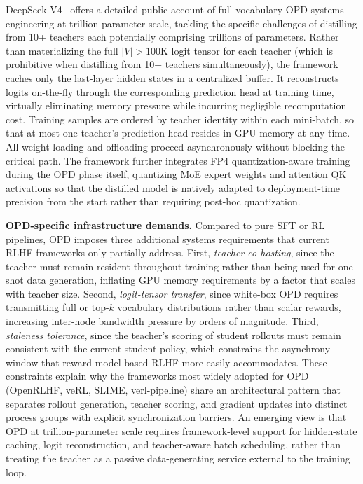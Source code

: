 \documentclass{article} %
\begin{document}
DeepSeek-V4~\citep{deepseekv4} offers a detailed public account of full-vocabulary OPD systems engineering at trillion-parameter scale, tackling the specific challenges of distilling from 10+ teachers each potentially comprising trillions of parameters. Rather than materializing the full $|V| > 100$K logit tensor for each teacher (which is prohibitive when distilling from 10+ teachers simultaneously), the framework caches only the last-layer hidden states in a centralized buffer. It reconstructs logits on-the-fly through the corresponding prediction head at training time, virtually eliminating memory pressure while incurring negligible recomputation cost. Training samples are ordered by teacher identity within each mini-batch, so that at most one teacher's prediction head resides in GPU memory at any time. All weight loading and offloading proceed asynchronously without blocking the critical path. The framework further integrates FP4 quantization-aware training during the OPD phase itself, quantizing MoE expert weights and attention QK activations so that the distilled model is natively adapted to deployment-time precision from the start rather than requiring post-hoc quantization.

\textbf{OPD-specific infrastructure demands.} Compared to pure SFT or RL pipelines, OPD imposes three additional systems requirements that current RLHF frameworks only partially address. First, \emph{teacher co-hosting}, since the teacher must remain resident throughout training rather than being used for one-shot data generation, inflating GPU memory requirements by a factor that scales with teacher size. Second, \emph{logit-tensor transfer}, since white-box OPD requires transmitting full or top-$k$ vocabulary distributions rather than scalar rewards, increasing inter-node bandwidth pressure by orders of magnitude. Third, \emph{staleness tolerance}, since the teacher's scoring of student rollouts must remain consistent with the current student policy, which constrains the asynchrony window that reward-model-based RLHF more easily accommodates. These constraints explain why the frameworks most widely adopted for OPD (OpenRLHF, veRL, SLIME, verl-pipeline) share an architectural pattern that separates rollout generation, teacher scoring, and gradient updates into distinct process groups with explicit synchronization barriers. An emerging view is that OPD at trillion-parameter scale requires framework-level support for hidden-state caching, logit reconstruction, and teacher-aware batch scheduling, rather than treating the teacher as a passive data-generating service external to the training loop.
\end{document}
